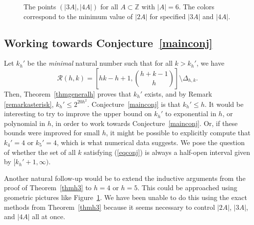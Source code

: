 \documentclass{daj}
\theoremstyle{definition}
\theoremstyle{remark}
\numberwithin{equation}{section}
\numberwithin{theorem}{section}
\newcommand{\Z}{\mathbb{Z}}
\newcommand{\calr}{\mathcal{R}}
\begin{document}
\begin{figure}[!ht]
\caption{The points $(|3A|,|4A|)$ for all $A \subset \Z$ with $|A| = 6$. The colors correspond to the minimum value of $|2A|$ for specified $|3A|$ and $|4A|$.}\label{fig3}
\end{figure}

\subsection{Working towards Conjecture~\ref{mainconj}}
Let $k_h'$ be the \emph{minimal} natural number such that for all $k>k_h'$, we have \begin{equation}\label{eqconj}\calr(h,k) = \left[hk-h+1,\binom{h+k-1}{h}\right]\setminus \Delta_{h,k}.\end{equation} Then, Theorem~\ref{thmgeneralh} proves that $k_h'$ exists, and by Remark \ref{remarkasterisk}, $k_h' \leq 2^{20h^2}$. Conjecture~\ref{mainconj} is that $k_h' \leq h$. It would be interesting to try to improve the upper bound on $k_h'$ to exponential in $h$, or polynomial in $h$, in order to work towards Conjecture~\ref{mainconj}. Or, if these bounds were improved for small $h$, it might be possible to explicitly compute that $k_4' = 4$ or $k_5' = 4$, which is what numerical data suggests. We pose the question of whether the set of all $k$ satisfying (\ref{eqconj}) is always a half-open interval given by $[k_{h}'+1,\infty)$.

Another natural follow-up would be to extend the inductive arguments from the proof of Theorem~\ref{thmh3} to $h=4$ or $h=5$. This could be approached using geometric pictures like Figure~\ref{fig3}. We have been unable to do this using the exact methods from Theorem~\ref{thmh3} because it seems necessary to control $|2A|$, $|3A|$, and $|4A|$ all at once. 
\end{document}
